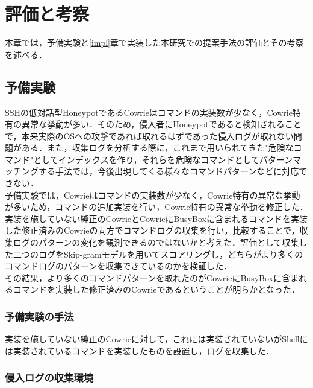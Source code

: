 \chapter{評価と考察}
\label{eval}

本章では，予備実験と\ref{impl}章で実装した本研究での提案手法の評価とその考察を述べる．

\section{予備実験}
\label{eval:first}

SSHの低対話型HoneypotであるCowrieはコマンドの実装数が少なく，Cowrie特有の異常な挙動が多い．そのため，侵入者にHoneypotであると検知されることで，本来実際のOSへの攻撃であれば取れるはずであった侵入ログが取れない問題がある．また，収集ログを分析する際に，これまで用いられてきた"危険なコマンド"としてインデックスを作り，それらを危険なコマンドとしてパターンマッチングする手法では，今後出現してくる様々なコマンドパターンなどに対応できない．\\
予備実験では，Cowrieはコマンドの実装数が少なく，Cowrie特有の異常な挙動が多いため，コマンドの追加実装を行い，Cowrie特有の異常な挙動を修正した．実装を施していない純正のCowrieとCowrieにBusyBoxに含まれるコマンドを実装した修正済みのCowrieの両方でコマンドログの収集を行い，比較することで，収集ログのパターンの変化を観測できるのではないかと考えた．評価として収集した二つのログをSkip-gramモデルを用いてスコアリングし，どちらがより多くのコマンドログのパターンを収集できているのかを検証した．\\
その結果，より多くのコマンドパターンを取れたのがCowrieにBusyBoxに含まれるコマンドを実装した修正済みのCowrieであるということが明らかとなった．

\subsection{予備実験の手法}
\label{eval:appr}
実装を施していない純正のCowrieに対して，これには実装されていないがShellには実装されているコマンドを実装したものを設置し，ログを収集した．

\subsection{侵入ログの収集環境}
\label{eval:apprenv}


